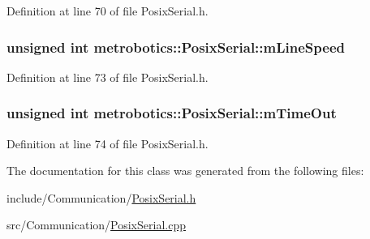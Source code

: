 \-Definition at line 70 of file \-Posix\-Serial.\-h.

\hypertarget{classmetrobotics_1_1PosixSerial_acffca69e71f5ced685bb28f185cdc5b1}{
\subsubsection[{m\-Line\-Speed}]{\setlength{\rightskip}{0pt plus 5cm}unsigned int {\bf metrobotics\-::\-Posix\-Serial\-::m\-Line\-Speed}}}\label{classmetrobotics_1_1PosixSerial_acffca69e71f5ced685bb28f185cdc5b1}


\-Definition at line 73 of file \-Posix\-Serial.\-h.

\hypertarget{classmetrobotics_1_1PosixSerial_a1e7511b3cf4f30f28285ff7a63036a27}{
\subsubsection[{m\-Time\-Out}]{\setlength{\rightskip}{0pt plus 5cm}unsigned int {\bf metrobotics\-::\-Posix\-Serial\-::m\-Time\-Out}}}\label{classmetrobotics_1_1PosixSerial_a1e7511b3cf4f30f28285ff7a63036a27}


\-Definition at line 74 of file \-Posix\-Serial.\-h.



\-The documentation for this class was generated from the following files\-:\begin{DoxyCompactItemize}
\item 
include/\-Communication/\hyperlink{PosixSerial_8h}{\-Posix\-Serial.\-h}\item 
src/\-Communication/\hyperlink{PosixSerial_8cpp}{\-Posix\-Serial.\-cpp}\end{DoxyCompactItemize}
